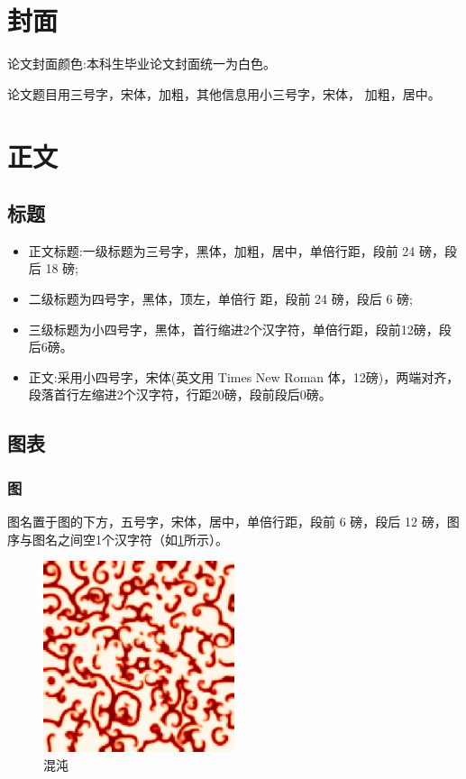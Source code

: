 \documentclass{LZU}
\begin{document}
\section{封面}
论文封面颜色:本科生毕业论文封面统一为白色。

论文题目用三号字，宋体，加粗，其他信息用小三号字，宋体， 加粗，居中。
\section{正文}
\subsection{标题}
\begin{itemize}
    \item 正文标题:一级标题为三号字，黑体，加粗，居中，单倍行距，段前 24 磅，段后 18 磅;
    \item 二级标题为四号字，黑体，顶左，单倍行 距，段前 24 磅，段后 6 磅;
    \item 三级标题为小四号字，黑体，首行缩进2个汉字符，单倍行距，段前12磅，段后6磅。
    \item 正文:采用小四号字，宋体(英文用 Times New Roman 体，12磅)，两端对齐，段落首行左缩进2个汉字符，行距20磅，段前段后0磅。
\end{itemize}

\subsection{图表}
\subsubsection{图}
\label{ssub:figure}
图名置于图的下方，五号字，宋体，居中，单倍行距，段前 6 磅，段后 12 磅，图序与图名之间空1个汉字符（如\cref{fig:chaos}所示）。
\begin{figure}
    \centering
    \includegraphics[width=0.5\textwidth]{pic/chaos.png}
    \caption{混沌}
    \label{fig:chaos}
\end{figure}
\end{document}
